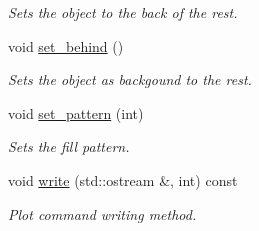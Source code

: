 \begin{DoxyCompactItemize}
\begin{DoxyCompactList}\small\item\em Sets the object to the back of the rest. \end{DoxyCompactList}\item 
\hypertarget{a00424_a52803d17ba9653b47a8acf44106142bf}{void \hyperlink{a00424_a52803d17ba9653b47a8acf44106142bf}{set\-\_\-behind} ()}\label{a00424_a52803d17ba9653b47a8acf44106142bf}

\begin{DoxyCompactList}\small\item\em Sets the object as backgound to the rest. \end{DoxyCompactList}\item 
\hypertarget{a00424_a8ac5b26f0527a012c8b7e93e0ee1de59}{void \hyperlink{a00424_a8ac5b26f0527a012c8b7e93e0ee1de59}{set\-\_\-pattern} (int)}\label{a00424_a8ac5b26f0527a012c8b7e93e0ee1de59}

\begin{DoxyCompactList}\small\item\em Sets the fill pattern. \end{DoxyCompactList}\item 
\hypertarget{a00424_a76abc2061c6608c1f6fb1c3ebcece64c}{void \hyperlink{a00424_a76abc2061c6608c1f6fb1c3ebcece64c}{write} (std\-::ostream \&, int) const }\label{a00424_a76abc2061c6608c1f6fb1c3ebcece64c}

\begin{DoxyCompactList}\small\item\em Plot command writing method. \end{DoxyCompactList}\end{DoxyCompactItemize}
